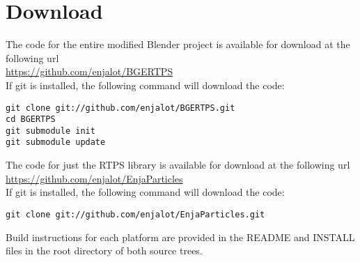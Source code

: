 
\section{Download}
\label{appendix:download}
The code for the entire modified Blender project is available for download at the following url \\
\url{https://github.com/enjalot/BGERTPS} \\
If git\cite{Git} is installed, the following command will
download the code: 
\begin{verbatim}
git clone git://github.com/enjalot/BGERTPS.git
cd BGERTPS
git submodule init
git submodule update
\end{verbatim} 

The code for just the RTPS library is available for download at the following url \\ 
\url{https://github.com/enjalot/EnjaParticles} \\
If git\cite{Git} is installed, the following command will
download the code: 
\begin{verbatim}
git clone git://github.com/enjalot/EnjaParticles.git
\end{verbatim} 

Build instructions for each platform are provided in the README and INSTALL
files in the root directory of both source trees.


